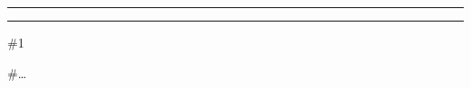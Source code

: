\documentclass[a4paper,10pt]{report}
\begin{document}
\begin{multicols*}{3}
\vfill

\hrule\vspace{2mm}
\vspace{2mm}\hrule\strut
\begin{packed_enum}
\item[\#1] 
\item[\#\ldots] 
\end{packed_enum}





\end{multicols*}
\end{document}
